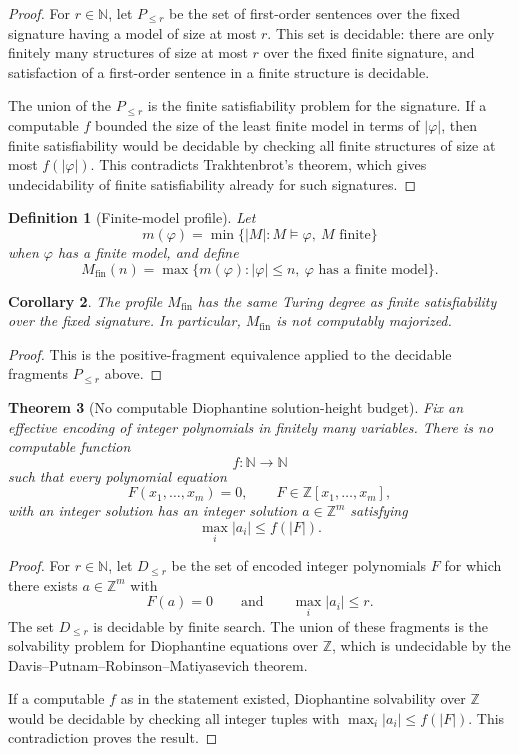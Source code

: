\documentclass[11pt]{article}
\newtheorem{theorem}{Theorem}[section]
\newtheorem{corollary}[theorem]{Corollary}
\newtheorem{definition}[theorem]{Definition}
\begin{document}
\begin{proof}
For \(r\in\mathbb N\), let \(P_{\leq r}\) be the set of first-order sentences over the fixed signature having a model of size at most \(r\). This set is decidable: there are only finitely many structures of size at most \(r\) over the fixed finite signature, and satisfaction of a first-order sentence in a finite structure is decidable.

The union of the \(P_{\leq r}\) is the finite satisfiability problem for the signature. If a computable \(f\) bounded the size of the least finite model in terms of \(|\varphi|\), then finite satisfiability would be decidable by checking all finite structures of size at most \(f(|\varphi|)\). This contradicts Trakhtenbrot's theorem, which gives undecidability of finite satisfiability already for such signatures.
\end{proof}

\begin{definition}[Finite-model profile]
Let
\[
m(\varphi)=\min\{|M|:M\models\varphi,\ M\text{ finite}\}
\]
when \(\varphi\) has a finite model, and define
\[
M_{\mathrm{fin}}(n)=
\max\{m(\varphi):|\varphi|\leq n,\ \varphi\text{ has a finite model}\}.
\]
\end{definition}

\begin{corollary}
The profile \(M_{\mathrm{fin}}\) has the same Turing degree as finite satisfiability over the fixed signature. In particular, \(M_{\mathrm{fin}}\) is not computably majorized.
\end{corollary}

\begin{proof}
This is the positive-fragment equivalence applied to the decidable fragments \(P_{\leq r}\) above.
\end{proof}

\begin{theorem}[No computable Diophantine solution-height budget]
Fix an effective encoding of integer polynomials in finitely many variables. There is no computable function
\[
f:\mathbb N\to\mathbb N
\]
such that every polynomial equation
\[
F(x_1,\ldots,x_m)=0,\qquad F\in\mathbb Z[x_1,\ldots,x_m],
\]
with an integer solution has an integer solution \(a\in\mathbb Z^m\) satisfying
\[
\max_i |a_i|\leq f(|F|).
\]
\end{theorem}

\begin{proof}
For \(r\in\mathbb N\), let \(D_{\leq r}\) be the set of encoded integer polynomials \(F\) for which there exists \(a\in\mathbb Z^m\) with
\[
F(a)=0
\qquad\text{and}\qquad
\max_i|a_i|\leq r.
\]
The set \(D_{\leq r}\) is decidable by finite search. The union of these fragments is the solvability problem for Diophantine equations over \(\mathbb Z\), which is undecidable by the Davis--Putnam--Robinson--Matiyasevich theorem.

If a computable \(f\) as in the statement existed, Diophantine solvability over \(\mathbb Z\) would be decidable by checking all integer tuples with \(\max_i|a_i|\leq f(|F|)\). This contradiction proves the result.
\end{proof}
\end{document}
